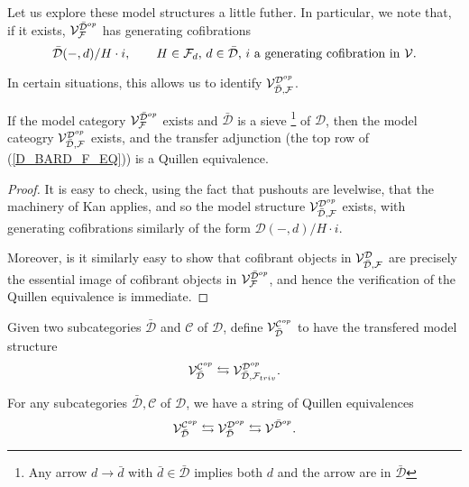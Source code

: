 \documentclass[a4paper,10pt]{article}%
\begin{document}
Let us explore these model structures a little futher. In particular, we note that, if it exists, $\mathcal V^{\bar{\mathcal D}^{op}}_{\mathcal F}$ has generating cofibrations
\[
\bar{\mathcal D}(-, d)/H \cdot i, \qquad \mbox{$H\in \mathcal F_d,$ $d\in \bar{\mathcal D}$, $i$ a generating cofibration in $\mathcal V$}.
\]

In certain situations, this allows us to identify $\mathcal V^{\mathcal D^{op}}_{\bar{\mathcal D}, \mathcal F}$. 

\begin{proposition}
  If the model category $\mathcal V^{\bar{\mathcal D}^{op}}_{\mathcal F}$ exists and $\bar{\mathcal D}$ is a sieve
\footnote{Any arrow $d \to \bar d$ with $\bar d \in \bar{\mathcal D}$ implies both $d$ and the arrow are in $\bar{\mathcal D}$}
 of $\mathcal D$, then the model cateogry $\mathcal V^{\mathcal D^{op}}_{\bar{\mathcal D},\mathcal F}$ exists, and the transfer adjunction (the top row of (\ref{D_BARD_F_EQ})) is a Quillen equivalence.
\end{proposition}
\begin{proof}
  It is easy to check, using the fact that pushouts are levelwise, that the machinery of Kan \cite[11.6.1]{Hi03} applies, and so the model structure $\mathcal V^{\mathcal D^{op}}_{\bar{\mathcal D}, \mathcal F}$ exists, with generating cofibrations similarly of the form
$\mathcal D(-,d)/H \cdot i$. 

Moreover, is it similarly easy to show that cofibrant objects in $\mathcal V^{\mathcal D}_{\bar{\mathcal D}, \mathcal F}$ are precisely the essential image of cofibrant objects in $\mathcal V^{\bar{\mathcal D}^{op}}_{\mathcal F}$, and hence the verification of the Quillen equivalence is immediate.
\end{proof}

\begin{definition}
  Given two subcategories $\bar{\mathcal D}$ and $\mathcal C$ of $\mathcal D$, define $\mathcal V_{\bar{\mathcal D}}^{\mathcal C^{op}}$ to have the transfered model structure
  \[
  \mathcal V_{\bar{\mathcal D}}^{\mathcal C^{op}} \leftrightarrows \mathcal V_{\bar{\mathcal D}, \mathcal F_{triv}}^{\mathcal D^{op}}.
  \]
\end{definition}
\begin{corollary}
  For any subcategories $\bar{\mathcal D}, \mathcal C$ of $\mathcal D$, we have a string of Quillen equivalences
\[
\mathcal V_{\bar{\mathcal D}}^{\mathcal C^{op}} \leftrightarrows \mathcal V_{\bar{\mathcal D}}^{\mathcal D^{op}} \leftrightarrows \mathcal V^{\bar{\mathcal D}^{op}}.
\]
\end{corollary}
\end{document}

